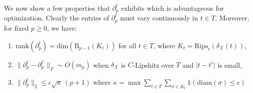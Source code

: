 \documentclass[10pt]{article}
\newtheorem{definition}{Definition}
\begin{document}
\noindent
We now show a few properties that $\partial_p^t$ exhibits which is advantageous for optimization. Clearly the entries of $\partial_p^t$ must vary continuously in $t \in T$. Moreover, for fixed $p \geq 0$, we have:
% 
\begin{enumerate}
	\item $\mathrm{rank}(\partial_p^t) = \mathrm{dim}(\mathrm{B}_{p-1}(K_t))$ for all $t \in T$, where $K_t = \mathrm{Rips}_{\epsilon}(\delta_{\mathcal{X}}(t))$, 
	\item $\lVert \partial_p^t - \partial_p^{t'} \rVert_F \sim O(m_p)$ when $\delta_\mathcal{X}$ is $C$-Lipshitz over $T$ and $\lvert t - t' \rvert$ is small,
	\item $\lVert \partial_p^t \rVert_{2} \leq \epsilon \sqrt{\kappa} \, (p+1)$ where $\kappa = \max \sum\limits_{t \in T}\sum\limits_{\sigma \in K_t}\mathds{1}(\mathrm{diam}(\sigma) \leq \epsilon)$
\end{enumerate}
\end{document}
